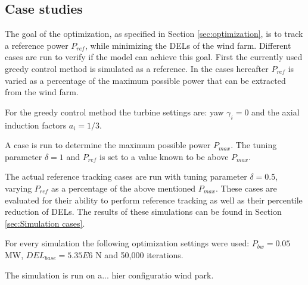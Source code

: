 \subsection{Case studies}
\label{sec:Case studies}
The goal of the optimization, as specified in Section \ref{sec:optimization}, is to track a reference power $P_{ref}$, while minimizing the DELs of the wind farm. Different cases are run to verify if the model can achieve this goal. First the currently used greedy control method is simulated as a reference. In the cases hereafter $P_{ref}$ is varied as a percentage of the maximum possible power that can be extracted from the wind farm.

For the greedy control method the turbine settings are: yaw $\gamma_i = 0$ and the axial induction factors $a_i = 1/3$. 

A case is run to determine the maximum possible power $P_{max}$. The tuning parameter $\delta = 1$ and $P_{ref}$ is set to a value known to be above $P_{max}$. 

The actual reference tracking cases are run with tuning parameter $\delta = 0.5$, varying $P_{ref}$ as a percentage of the above mentioned $P_{max}$. These cases are evaluated for their ability to perform reference tracking as well as their percentile reduction of DELs. The results of these simulations can be found in Section \ref{sec:Simulation cases}.

For every simulation the following optimization settings were used: $P_{bw} = 0.05$ MW, $DEL_{base} = 5.35E6$ N and 50,000 iterations. 

The simulation is run on a... hier configuratio wind park.
